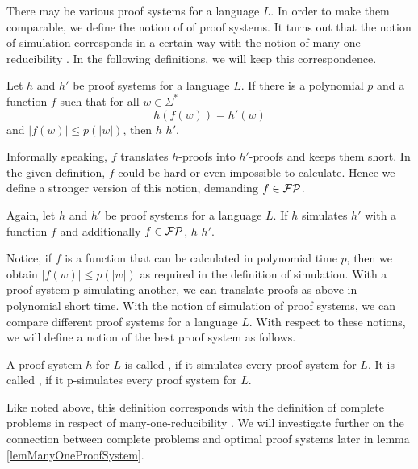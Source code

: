   There may be various proof systems for a language \(L\). In order to make them comparable, we define the notion of  of proof systems. It turns out that the notion of simulation corresponds in a certain way with the notion of many-one reducibility \cite{KM00}. In the following definitions, we will keep this correspondence.
  
  \begin{definition}
    Let \(h\) and \(h'\) be proof systems for a language \(L\). If there is a polynomial \(p\) and a function \(f\) such that for all \(w \in \Sigma^*\)
      \[
        h(f(w)) = h'(w)
      \]
    and \(|f(w)| \leq p(|w|)\), then \(h\)  \(h'\).
  \end{definition}

  Informally speaking, \(f\) translates \(h\)-proofs into \(h'\)-proofs and keeps them short. In the given definition, \(f\) could be hard or even impossible to calculate. Hence we define a stronger version of this notion, demanding \(f \in \mathcal{FP}\).

  \begin{definition}
   Again, let \(h\) and \(h'\) be proof systems for a language \(L\). If \(h\) simulates \(h'\) with a function \(f\) and additionally \(f \in \mathcal{FP}\), \(h\)  \(h'\).
  \end{definition}

  Notice, if \(f\) is a function that can be calculated in polynomial time \(p\), then we obtain \(|f(w)| \leq p(|w|)\) as required in the definition of simulation. With a proof system p-simulating another, we can translate proofs as above in polynomial short time. With the notion of simulation of proof systems, we can compare different proof systems for a language \(L\). With respect to these notions, we will define a notion of the best proof system as follows.

  \begin{definition}
    A proof system \(h\) for \(L\) is called , if it simulates every proof system for \(L\). It is called , if it p-simulates every proof system for \(L\).
  \end{definition}

   Like noted above, this definition corresponds with the definition of complete problems in respect of many-one-reducibility \cite{KMT03}. We will investigate further on the connection between complete problems and optimal proof systems later in lemma \ref{lemManyOneProofSystem}.


